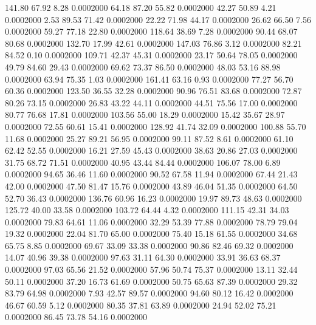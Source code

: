  141.80   67.92    8.28   0.0002000
  64.18   87.20   55.82   0.0002000
  42.27   50.89    4.21   0.0002000
   2.53   89.53   71.42   0.0002000
  22.22   71.98   44.17   0.0002000
  26.62   66.50    7.56   0.0002000
  59.27   77.18   22.80   0.0002000
 118.64   38.69    7.28   0.0002000
  90.44   68.07   80.68   0.0002000
 132.70   17.99   42.61   0.0002000
 147.03   76.86    3.12   0.0002000
  82.21   84.52    0.10   0.0002000
 109.71   42.37   45.31   0.0002000
  23.17   50.64   78.05   0.0002000
  49.79   84.60   29.43   0.0002000
  69.62   73.37   86.50   0.0002000
  48.03   53.16   88.98   0.0002000
  63.94   75.35    1.03   0.0002000
 161.41   63.16    0.93   0.0002000
  77.27   56.70   60.36   0.0002000
 123.50   36.55   32.28   0.0002000
  90.96   76.51   83.68   0.0002000
  72.87   80.26   73.15   0.0002000
  26.83   43.22   44.11   0.0002000
  44.51   75.56   17.00   0.0002000
  80.77   76.68   17.81   0.0002000
 103.56   55.00   18.29   0.0002000
  15.42   35.67   28.97   0.0002000
  72.55   60.61   15.41   0.0002000
 128.92   41.74   32.09   0.0002000
 100.88   55.70   11.68   0.0002000
  25.27   89.21   56.95   0.0002000
  99.11   87.52    8.61   0.0002000
  61.10   62.42   52.55   0.0002000
  16.21   27.59   45.43   0.0002000
  38.63   20.86   27.03   0.0002000
  31.75   68.72   71.51   0.0002000
  40.95   43.44   84.44   0.0002000
 106.07   78.00    6.89   0.0002000
  94.65   36.46   11.60   0.0002000
  90.52   67.58   11.94   0.0002000
  67.44   21.43   42.00   0.0002000
  47.50   81.47   15.76   0.0002000
  43.89   46.04   51.35   0.0002000
  64.50   52.70   36.43   0.0002000
 136.76   60.96   16.23   0.0002000
  19.97   89.73   48.63   0.0002000
 125.72   40.00   33.58   0.0002000
 103.72   64.44    4.32   0.0002000
 111.15   42.31   34.03   0.0002000
  79.83   64.61   11.06   0.0002000
  32.29   53.39   77.88   0.0002000
  78.79   79.04   19.32   0.0002000
  22.04   81.70   65.00   0.0002000
  75.40   15.18   61.55   0.0002000
  34.68   65.75    8.85   0.0002000
  69.67   33.09   33.38   0.0002000
  90.86   82.46   69.32   0.0002000
  14.07   40.96   39.38   0.0002000
  97.63   31.11   64.30   0.0002000
  33.91   36.63   68.37   0.0002000
  97.03   65.56   21.52   0.0002000
  57.96   50.74   75.37   0.0002000
  13.11   32.44   50.11   0.0002000
  37.20   16.73   61.69   0.0002000
  50.75   65.63   87.39   0.0002000
  29.32   83.79   64.98   0.0002000
   7.93   42.57   89.57   0.0002000
  94.60   80.12   16.42   0.0002000
  46.67   60.59    5.12   0.0002000
  80.35   37.81   63.89   0.0002000
  24.94   52.02   75.21   0.0002000
  86.45   73.78   54.16   0.0002000
